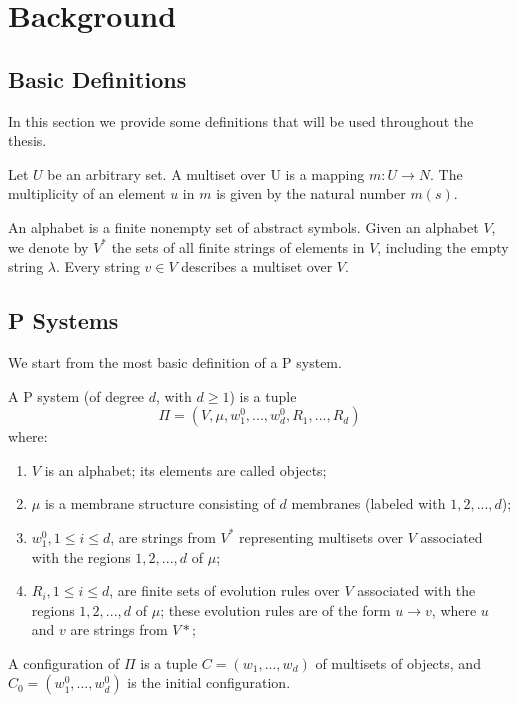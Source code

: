 \chapter{Background}

\section{Basic Definitions}

In this section we provide some definitions that will be used throughout the thesis.

\begin{definition}[Multiset]
Let $U$ be an arbitrary set. A multiset over U is a mapping \newline $m : U \rightarrow N$.
The multiplicity of an element $u$ in $m$ is given by the natural number $m(s)$.
\end{definition}

\begin{definition}[Alphabet]
An alphabet is a finite nonempty set of abstract symbols. Given an alphabet $V$, we denote by $V^*$
the sets of all finite strings of elements in $V$, including the empty string $\lambda$.
Every string $v \in V$ describes a multiset over $V$.
\end{definition}


\section{P Systems}

We start from the most basic definition of a P system.

\begin{definition}[P system]
A P system (of degree $d$, with $d \geq 1$) is a tuple
\[ \Pi = (V,\mu,w^0_1,...,w^0_d,R_1,...,R_d)\]
where:
\begin{enumerate}
  \item $V$ is an alphabet; its elements are called objects;
  \item $\mu$ is a membrane structure consisting of $d$ membranes (labeled with $1,2,...,d$);
  \item $w^0_1, 1 \leq i \leq d$, are strings from $V^*$ representing multisets over $V$ associated
  with the regions $1,2,...,d$ of $\mu$;
  \item $R_i, 1 \leq i \leq d$, are finite sets of evolution rules over $V$ associated 
  with the regions $1,2,...,d$ of $\mu$; these evolution rules are of the form $u \rightarrow v$,
  where $u$ and $v$ are strings from $V*$;
\end{enumerate}
A configuration of $\Pi$ is a tuple $C=(w_1,...,w_d)$ of multisets of objects, and 
$C_0=(w^0_1,...,w^0_d)$ is the initial configuration.
\end{definition}

